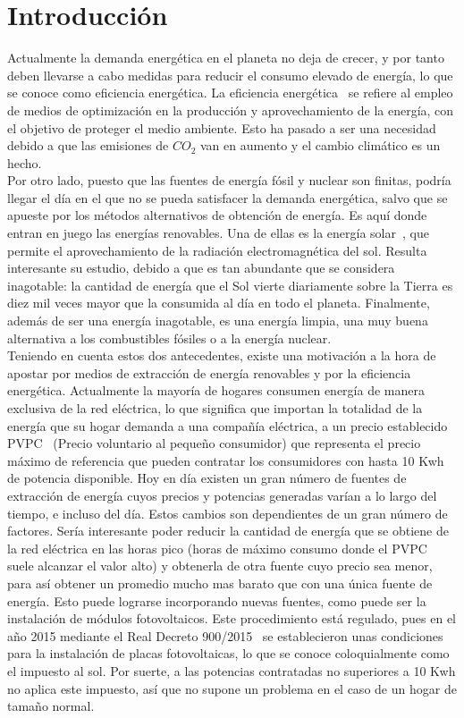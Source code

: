 \chapter{Introducción}
\label{cap:Introduccion}
Actualmente la demanda energética en el planeta no deja de crecer, y por tanto deben llevarse a cabo medidas para reducir el consumo elevado de energía, lo que se conoce como eficiencia energética. La eficiencia energética~\cite{GarSa12} se refiere al empleo de medios de optimización en la producción y aprovechamiento de la energía, con el objetivo de proteger el medio ambiente. Esto ha pasado a ser una necesidad debido a que las emisiones de $ CO_{2} $ van en aumento y el cambio climático es un hecho.\\

Por otro lado, puesto que las fuentes de energía fósil y nuclear son finitas, podría llegar el día en el que no se pueda satisfacer la demanda energética, salvo que se apueste por los métodos alternativos de obtención de energía. Es aquí donde entran en juego las energías renovables. Una de ellas es la energía solar~\cite{Perp12}, que permite el aprovechamiento de la radiación electromagnética del sol. Resulta interesante su estudio, debido a que es tan abundante que se considera inagotable: la cantidad de energía que el Sol vierte diariamente sobre la Tierra es diez mil veces mayor que la consumida al día en todo el planeta. Finalmente, además de ser una energía inagotable, es una energía limpia, una muy buena alternativa a los combustibles fósiles o a la energía nuclear. \\

Teniendo en cuenta estos dos antecedentes, existe una motivación a la hora de apostar por medios de extracción de energía renovables y por la eficiencia energética. Actualmente la mayoría de hogares consumen energía de manera exclusiva de la red eléctrica, lo que significa que importan la totalidad de la energía que su hogar demanda a una compañía eléctrica, a un precio establecido \gls{PVPC}~\cite{Ree14} (Precio voluntario al pequeño consumidor) que representa el precio máximo de referencia que pueden contratar los consumidores con hasta 10 Kwh de potencia disponible. Hoy en día existen un gran número de fuentes de extracción de energía cuyos precios y potencias generadas varían a lo largo del tiempo, e incluso del día. Estos cambios son dependientes de un gran número de factores. Sería interesante poder reducir la cantidad de energía que se obtiene de la red eléctrica en las horas pico (horas de máximo consumo donde el \gls{PVPC} suele alcanzar el valor alto) y obtenerla de otra fuente cuyo precio sea menor, para así obtener un promedio mucho mas barato que con una única fuente de energía. Esto puede lograrse incorporando nuevas fuentes, como puede ser la instalación de módulos fotovoltaicos. Este procedimiento está regulado, pues en el año 2015 mediante el Real Decreto 900/2015~\cite{Boe15} se establecieron unas condiciones para la instalación de placas fotovoltaicas, lo que se conoce coloquialmente como el impuesto al sol. Por suerte, a las potencias contratadas no superiores a 10 Kwh no aplica este impuesto, así que no supone un problema en el caso de un hogar de tamaño normal.\\

